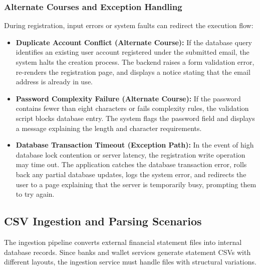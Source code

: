 \subsubsection{Alternate Courses and Exception Handling}
During registration, input errors or system faults can redirect the execution flow:
\begin{itemize}
	\item \textbf{Duplicate Account Conflict (Alternate Course):} If the database query identifies an existing user account registered under the submitted email, the system halts the creation process. The backend raises a form validation error, re-renders the registration page, and displays a notice stating that the email address is already in use.
	\item \textbf{Password Complexity Failure (Alternate Course):} If the password contains fewer than eight characters or fails complexity rules, the validation script blocks database entry. The system flags the password field and displays a message explaining the length and character requirements.
	\item \textbf{Database Transaction Timeout (Exception Path):} In the event of high database lock contention or server latency, the registration write operation may time out. The application catches the database transaction error, rolls back any partial database updates, logs the system error, and redirects the user to a page explaining that the server is temporarily busy, prompting them to try again.
\end{itemize}

\subsection{CSV Ingestion and Parsing Scenarios}
The ingestion pipeline converts external financial statement files into internal database records. Since banks and wallet services generate statement CSVs with different layouts, the ingestion service must handle files with structural variations.
